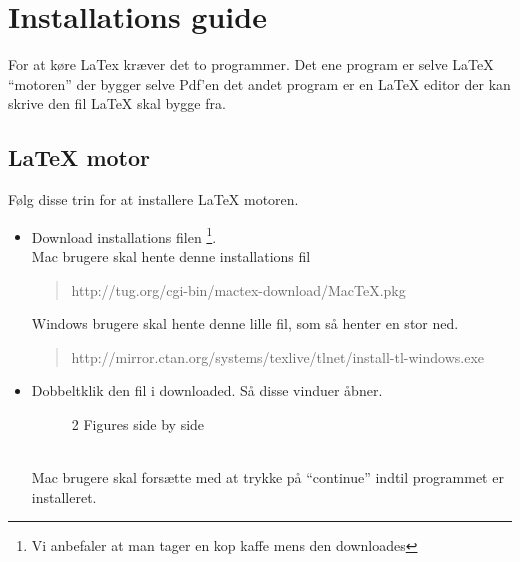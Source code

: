 \documentclass{article}                                                        %
\begin{document}
\section{Installations guide}
    For at køre LaTex kræver det to programmer.
    Det ene program er selve LaTeX ``motoren'' der bygger selve Pdf'en
    det andet program er en LaTeX editor der kan skrive den fil LaTeX skal bygge
    fra.

    \subsection{LaTeX motor}
    Følg disse trin for at installere LaTeX motoren.

    \begin{itemize}
        \item Download installations filen
        \footnote{Vi anbefaler at man tager en kop kaffe mens den downloades}. \\
        Mac brugere skal hente denne installations fil
        \begin{quote}
         http://tug.org/cgi-bin/mactex-download/MacTeX.pkg
        \end{quote}

        Windows brugere skal hente denne lille fil, som så henter en stor ned.
        \begin{quote}
        http://mirror.ctan.org/systems/texlive/tlnet/install-tl-windows.exe
        \end{quote}

        \item Dobbeltklik den fil i downloaded. Så disse vinduer åbner.
		\begin{figure}[h]
    		\centering
	    	\qquad
		    \caption{2 Figures side by side}%
		\end{figure}\\
        Mac brugere skal forsætte med at trykke på ``continue'' indtil programmet
        er installeret. 
        

\end{itemize}
\end{document}
